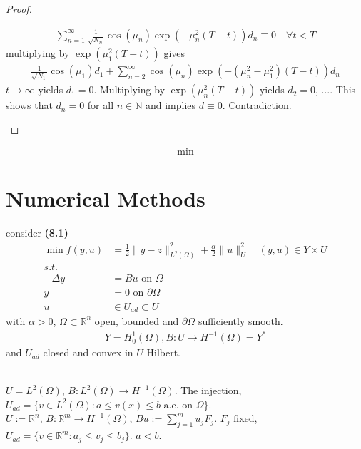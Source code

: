 \begin{proof}
\begin{enumerate}
		\begin{align*}
			\sum_{n = 1}^\infty \frac{1}{\sqrt{N_n}} \cos(\mu_n) \exp(-\mu_n^2(T - t))d_n \equiv 0 \quad \forall t < T
		\end{align*}
		multiplying by $\exp(\mu_1^2(T - t))$ gives
		\begin{align*}
			\frac{1}{\sqrt{N_1}} \cos(\mu_1) d_1 + \sum_{n = 2}^\infty \cos(\mu_n) \exp( - (\mu_n^2 - \mu_1^2) (T - t))d_n
		\end{align*}
		$t \rightarrow \infty$ yields $d_1 = 0$. Multiplying by $\exp(\mu_n^2 (T - t))$ yields $d_2 = 0$, $\dots$. This shows that $d_n =0$ for all $ n \in \mathbb{N}$ and implies $d \equiv 0$. Contradiction. 
	\end{enumerate}
\end{proof}

\begin{example}
\begin{align*}
	\min
\end{align*}	
\end{example}

\section{Numerical Methods}
consider \textbf{(8.1)}
\begin{align*}
	\min f(y, u) &= \frac{1}{2}\|y - z\|^2_{L^2(\Omega)} + \frac{\alpha}{2}\|u\|_U^2 \quad (y, u) \in Y \times U\\
	s.t.\\
	-\Delta y &= B u \text{ on } \Omega\\
	y &= 0 \text{ on } \partial \Omega\\
	u &\in U_{ad} \subset U
\end{align*}
with $\alpha > 0$, $\Omega \subset \mathbb{R}^n$ open, bounded and $\partial \Omega$ sufficiently smooth. 
\begin{align*}
	Y = H_0^1(\Omega), B : U \rightarrow H^{-1}(\Omega) = Y^*
\end{align*}
and $U_{ad}$ closed and convex in $U$ Hilbert.

\begin{example}\quad\\
$U = L^2(\Omega)$, $B: L^2(\Omega) \rightarrow H^{-1}(\Omega)$. The injection, $U_{ad} = \{ v \in L^2(\Omega): a \le v(x) \le b \text{ a.e. on } \Omega\}$. \\
$U := \mathbb{R}^n$, $B: \mathbb{R}^m \rightarrow H^{-1}(\Omega)$, $Bu := \sum_{j =1}^m u_j F_j$. $F_j$ fixed, $U_{ad} = \{v \in \mathbb{R}^m: a_j \le v_j \le b_j \}$. $a < b$. 	
\end{example}

